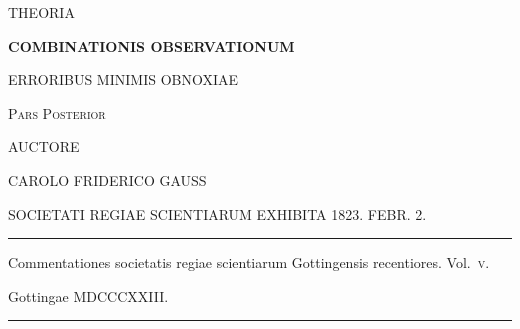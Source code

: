 \clearpage
{}
\thispagestyle{empty}
\begin{center}
\vspace*{2em}
{\Large THEORIA\par}
\bigskip
{\Large\bfseries COMBINATIONIS OBSERVATIONUM\par}
\bigskip
{\large ERRORIBUS MINIMIS OBNOXIAE\par}
\bigskip
{\large\textsc{Pars Posterior}\par}
\bigskip
AUCTORE\par
\bigskip
{\large CAROLO FRIDERICO GAUSS\par}
\bigskip
{\small SOCIETATI REGIAE SCIENTIARUM EXHIBITA 1823. FEBR. 2.\par}
\bigskip
\rule{.22\linewidth}{.3pt}\par
\bigskip
Commentationes societatis regiae scientiarum Gottingensis recentiores.
\mbox{Vol.~\textsc{v}.}
\par\medskip
Gottingae MDCCCXXIII.
\par\bigskip
\rule{.22\linewidth}{.3pt}
\end{center}
\clearpage
\renewcommand{\Article}[1]{\par\medskip\Needspace{4\baselineskip}\pdfbookmark[1]{Art. #1}{theoria-posterior-art-#1}\centerline{\textbf{#1.}}\nobreak\smallskip}
